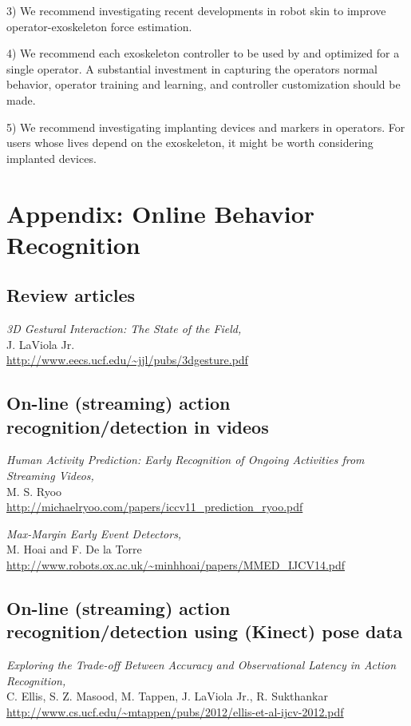 \documentclass[letterpaper,12pt,fullpage]{article}
\begin{document}
3) We recommend investigating recent developments in robot skin to improve
operator-exoskeleton force estimation.

4) We recommend each exoskeleton controller
to be used by and optimized for a single operator.
A substantial investment in capturing the operators normal behavior,
operator training and learning, and controller customization should be made.

5) We recommend investigating implanting devices and markers in operators.
For users whose lives depend on the exoskeleton,
it might be worth considering implanted devices.

\section{Appendix: Online Behavior Recognition}

\subsection{Review articles}

{\it 3D Gestural Interaction: The State of the Field,}\\
J. LaViola Jr.\\
\url{http://www.eecs.ucf.edu/~jjl/pubs/3dgesture.pdf}

\subsection{On-line (streaming) action recognition/detection in videos}

{\it Human Activity Prediction: Early Recognition of Ongoing Activities
from Streaming Videos,}\\
M. S. Ryoo\\
\url{http://michaelryoo.com/papers/iccv11_prediction_ryoo.pdf}

{\it Max-Margin Early Event Detectors,}\\
M. Hoai and F. De la Torre\\
\url{http://www.robots.ox.ac.uk/~minhhoai/papers/MMED_IJCV14.pdf}

\subsection{On-line (streaming) action recognition/detection using (Kinect) pose data}

{\it Exploring the Trade-off Between Accuracy and Observational Latency in
Action Recognition,}\\
C. Ellis, S. Z. Masood, M. Tappen, J. LaViola Jr., R. Sukthankar\\
\url{http://www.cs.ucf.edu/~mtappen/pubs/2012/ellis-et-al-ijcv-2012.pdf}
\end{document}

